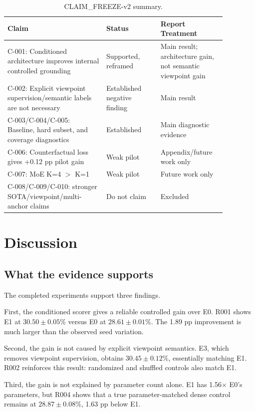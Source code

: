 \documentclass[11pt]{article}
\newcommand{\pp}{pp}
\begin{document}
\begin{table}[t]
\centering
\small
\caption{CLAIM\_FREEZE-v2 summary.}
\label{tab:claims}
\begin{tabular}{p{0.40\linewidth}p{0.22\linewidth}p{0.25\linewidth}}
\toprule
Claim & Status & Report Treatment \\
\midrule
C-001: Conditioned architecture improves internal controlled grounding & Supported, reframed & Main result; architecture gain, not semantic viewpoint gain \\
C-002: Explicit viewpoint supervision/semantic labels are not necessary & Established negative finding & Main result \\
C-003/C-004/C-005: Baseline, hard subset, and coverage diagnostics & Established & Main diagnostic evidence \\
C-006: Counterfactual loss gives +0.12 \pp{} pilot gain & Weak pilot & Appendix/future work only \\
C-007: MoE K=4 $>$ K=1 & Weak pilot & Future work only \\
C-008/C-009/C-010: stronger SOTA/viewpoint/multi-anchor claims & Do not claim & Excluded \\
\bottomrule
\end{tabular}
\end{table}

\section{Discussion}

\subsection{What the evidence supports}

The completed experiments support three findings.

First, the conditioned scorer gives a reliable controlled gain over E0. R001 shows E1 at $30.50\pm0.05$\% versus E0 at $28.61\pm0.01$\%. The 1.89 \pp{} improvement is much larger than the observed seed variation.

Second, the gain is not caused by explicit viewpoint semantics. E3, which removes viewpoint supervision, obtains $30.45\pm0.12$\%, essentially matching E1. R002 reinforces this result: randomized and shuffled controls also match E1.

Third, the gain is not explained by parameter count alone. E1 has 1.56$\times$ E0's parameters, but R004 shows that a true parameter-matched dense control remains at $28.87\pm0.08$\%, 1.63 \pp{} below E1.
\end{document}

